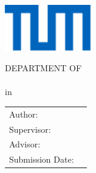 \begin{titlepage}
	\centering

	\includegraphics[height=20mm]{logos/tum.pdf}

	\vspace{5mm}
	{\huge\MakeUppercase{Department of \getFaculty{}}}\\

	\vspace{5mm}
	{\large\MakeUppercase{\getUniversity{}}}\\

	\vspace{20mm}
	{\Large \getDoctype{} in \getStudies{}}

	\vspace{15mm}
	{\huge\bfseries \getTitle{}}

	\vspace{10mm}
	{\huge\bfseries \foreignlanguage{ngerman}{\getTitleGer{}}}

	\vspace{15mm}
	\begin{tabular}{l l}
		Author:          & \getAuthor{}         \\
		Supervisor:      & \getSupervisor{}     \\
		Advisor:         & \getAdvisor{}        \\
		Submission Date: & \getSubmissionDate{} \\
	\end{tabular}

\end{titlepage}
